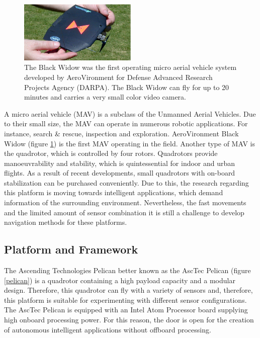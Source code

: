 \documentclass[a4paper]{article}
\begin{document}
\begin{figure}[!h]
	\centering
	\includegraphics[width=0.5\textwidth]{images/blackwidow.eps}
	\caption{The Black Widow was the first operating micro aerial vehicle system developed by AeroVironment for Defense Advanced Research Projects Agency (DARPA). The Black Widow can fly for up to 20 minutes and carries a very small color video camera.}
	\label{blackwidow}
\end{figure}

A micro aerial vehicle (MAV) is a subclass of the Unmanned Aerial Vehicles. Due to their small size, the MAV can operate in numerous robotic applications. For instance, search \&  rescue, inspection and exploration. AeroVironment Black Widow (figure \ref{blackwidow}) is the first MAV operating in the field. Another type of MAV is the quadrotor, which is controlled by four rotors. Quadrotors provide manoeuvrability and stability, which is quintessential for indoor and urban flights. As a result of recent developments, small quadrotors with on-board stabilization can be purchased conveniently. Due to this, the research regarding this platform is moving towards intelligent applications, which demand information of the surrounding environment. Nevertheless, the fast movements and the limited amount of sensor combination it is still a challenge to develop navigation methods for these platforms.

\subsection{Platform and Framework}
The Ascending Technologies Pelican better known as the AscTec Pelican (figure \ref{pelican}) is a quadrotor containing a high payload capacity and a modular design. Therefore, this quadrotor can fly with a variety of sensors and, therefore, this platform is suitable for experimenting with different sensor configurations. The AscTec Pelican is equipped with an Intel Atom Processor board supplying high onboard processing power. For this reason, the door is open for the creation of autonomous intelligent applications without offboard processing.
\end{document}
